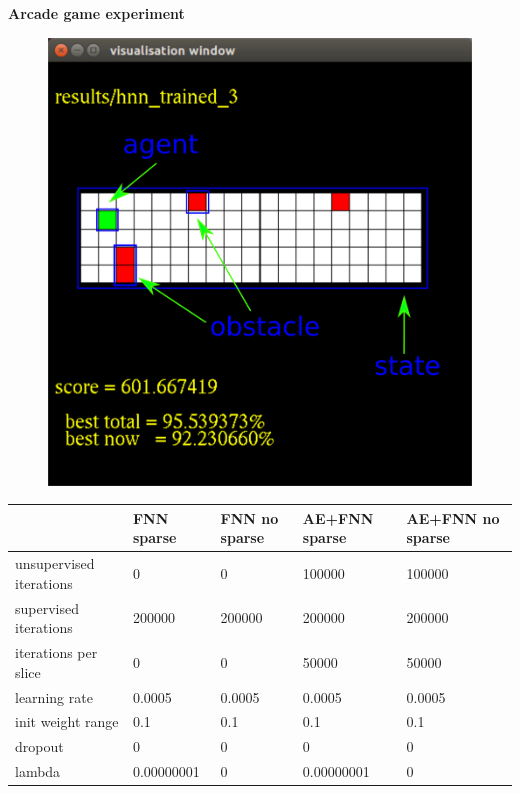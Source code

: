 \documentclass[xcolor=dvipsnames]{beamer}
\begin{document}
\begin{frame}{\bf Arcade game experiment}


\begin{figure}[htbp]
  \centering
  \includegraphics[scale=0.21]{../../diagrams/arcade_rl_game_desc.png}
\end{figure}

{
\tiny

\begin{table}[!h]
\centering
\begin{tabular}{|l|l|l|l|l|}
\hline
                        & FNN sparse & FNN no sparse & AE+FNN  sparse & AE+FNN no sparse \\ \hline
unsupervised iterations & 0          & 0             & 100000         & 100000           \\ \hline
supervised iterations   & 200000     & 200000        & 200000         & 200000           \\ \hline
iterations per slice    & 0          & 0             & 50000          & 50000            \\ \hline
learning rate           & 0.0005     & 0.0005        & 0.0005         & 0.0005           \\ \hline
init weight range       & 0.1        & 0.1           & 0.1            & 0.1              \\ \hline
dropout                 & 0          & 0             & 0              & 0                \\ \hline
lambda                  & 0.00000001 & 0             & 0.00000001     & 0                \\ \hline
\end{tabular}
\end{table}

}

\end{frame}
\end{document}
